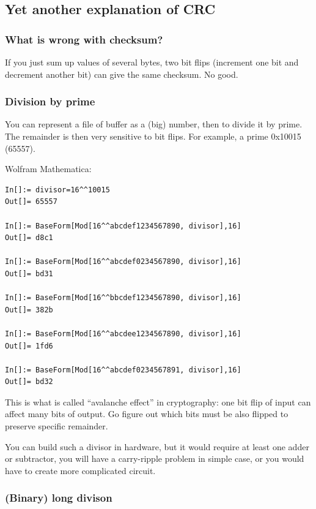 \subsection{Yet another explanation of \ac{CRC}}

\subsubsection{What is wrong with checksum?}

If you just sum up values of several bytes, two bit flips (increment one bit and decrement another bit) can
give the same checksum.
No good.

\subsubsection{Division by prime}

You can represent a file of buffer as a (big) number, then to divide it by prime.
The remainder is then very sensitive to bit flips.
For example, a prime 0x10015 (65557).

Wolfram Mathematica:

\begin{lstlisting}
In[]:= divisor=16^^10015
Out[]= 65557

In[]:= BaseForm[Mod[16^^abcdef1234567890, divisor],16]
Out[]= d8c1

In[]:= BaseForm[Mod[16^^abcdef0234567890, divisor],16]
Out[]= bd31

In[]:= BaseForm[Mod[16^^bbcdef1234567890, divisor],16]
Out[]= 382b

In[]:= BaseForm[Mod[16^^abcdee1234567890, divisor],16]
Out[]= 1fd6

In[]:= BaseForm[Mod[16^^abcdef0234567891, divisor],16]
Out[]= bd32
\end{lstlisting}

This is what is called ``avalanche effect'' in cryptography: one bit flip of input can affect many bits of output.
Go figure out which bits must be also flipped to preserve specific remainder.

You can build such a divisor in hardware, but it would require at least one adder or subtractor, you will have
a carry-ripple problem in simple case, or you would have to create more complicated circuit.

\subsubsection{(Binary) long divison}

